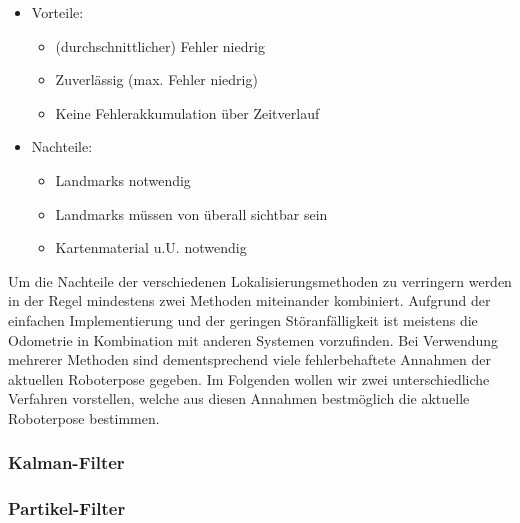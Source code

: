 \begin{itemize}
  \item Vorteile:
  \begin{itemize}
    \item (durchschnittlicher) Fehler niedrig
    \item Zuverlässig (max. Fehler niedrig)
    \item Keine Fehlerakkumulation über Zeitverlauf
  \end{itemize}
  \item Nachteile:
  \begin{itemize}
    \item Landmarks notwendig
    \item Landmarks müssen von überall sichtbar sein
    \item Kartenmaterial u.U. notwendig
   \end{itemize}
\end{itemize}

Um die Nachteile der verschiedenen Lokalisierungsmethoden zu
 verringern werden in der Regel mindestens zwei Methoden miteinander
 kombiniert. Aufgrund der einfachen Implementierung und der geringen
 Störanfälligkeit ist meistens die Odometrie in Kombination mit
 anderen Systemen vorzufinden. Bei Verwendung mehrerer Methoden sind
 dementsprechend viele fehlerbehaftete Annahmen der aktuellen
 Roboterpose gegeben. Im Folgenden wollen wir zwei unterschiedliche
 Verfahren vorstellen, welche aus diesen Annahmen bestmöglich die
 aktuelle Roboterpose bestimmen.
 
\subsubsection{Kalman-Filter}















\subsubsection{Partikel-Filter}

